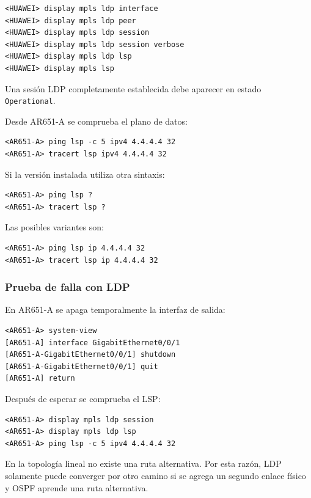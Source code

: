 \begin{lstlisting}[style=terminal]
<HUAWEI> display mpls ldp interface
<HUAWEI> display mpls ldp peer
<HUAWEI> display mpls ldp session
<HUAWEI> display mpls ldp session verbose
<HUAWEI> display mpls ldp lsp
<HUAWEI> display mpls lsp
\end{lstlisting}

Una sesión LDP completamente establecida debe aparecer en estado
\texttt{Operational}.

Desde AR651-A se comprueba el plano de datos:

\begin{lstlisting}[style=terminal]
<AR651-A> ping lsp -c 5 ipv4 4.4.4.4 32
<AR651-A> tracert lsp ipv4 4.4.4.4 32
\end{lstlisting}

Si la versión instalada utiliza otra sintaxis:

\begin{lstlisting}[style=terminal]
<AR651-A> ping lsp ?
<AR651-A> tracert lsp ?
\end{lstlisting}

Las posibles variantes son:

\begin{lstlisting}[style=terminal]
<AR651-A> ping lsp ip 4.4.4.4 32
<AR651-A> tracert lsp ip 4.4.4.4 32
\end{lstlisting}

\subsubsection{Prueba de falla con LDP}

En AR651-A se apaga temporalmente la interfaz de salida:

\begin{lstlisting}[style=terminal]
<AR651-A> system-view
[AR651-A] interface GigabitEthernet0/0/1
[AR651-A-GigabitEthernet0/0/1] shutdown
[AR651-A-GigabitEthernet0/0/1] quit
[AR651-A] return
\end{lstlisting}

Después de esperar se comprueba el LSP:

\begin{lstlisting}[style=terminal]
<AR651-A> display mpls ldp session
<AR651-A> display mpls ldp lsp
<AR651-A> ping lsp -c 5 ipv4 4.4.4.4 32
\end{lstlisting}

En la topología lineal no existe una ruta alternativa. Por esta razón, LDP
solamente puede converger por otro camino si se agrega un segundo enlace
físico y OSPF aprende una ruta alternativa.

